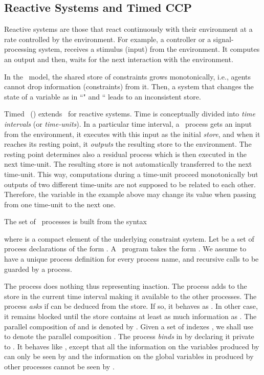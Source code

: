\documentclass{tlp}
\begin{document}
\subsection{Reactive Systems and  Timed CCP}
\label{sec:tcc-definition}
Reactive systems \cite{BeGo92} are those that react continuously with
their environment at a  rate controlled by the environment. 
For example, a controller or a  signal-processing system, receives a
stimulus (input) from the environment. It computes an output  and
then, waits for the next interaction with the environment. 

In the \ccp\ model,  the shared store of constraints grows
monotonically, i.e., agents cannot drop information (constraints)
from it. Then, a system that changes the state of a  variable as in  ``" and `` leads to an inconsistent store. 

Timed \ccp\   (\tccp) \cite{tcc-lics94} extends \ccp\  for
reactive  systems. Time is conceptually divided into \emph{time
intervals }(or \emph{time-units}). In a particular time
interval, a \ccp\ process   gets an input  
from the environment, it executes with this input as the initial
\emph{store}, and when it reaches
its resting point, it \emph{outputs} the resulting store  to the
environment. The resting point determines also a residual process 
which is then executed in the next time-unit. The resulting store 
is not automatically transferred to the next time-unit.
This way, computations during a time-unit proceed monotonically but
outputs of two different time-units are not supposed to be related to
each other. Therefore, the variable  in the example
above may change its value when passing from one 
time-unit to the next one.  
\begin{definition}\label{tcc:syntax} The set
 of \tccp\ processes is built from the syntax

where  is a compact element of the underlying constraint system.
Let  be a set of process declarations of the form
. A \tccp\ program takes the form .  We assume  to have a unique process definition for every process name, and recursive calls to be guarded by a  process. 
\end{definition}

The process  does nothing thus representing inaction. The
process   adds  to the store in the current time
interval making it available to the other processes. 
The process  \emph{asks} if  can be deduced from the
store. If so, it behaves as . In other case, it remains blocked
until the store contains at least as much information as .
 The parallel composition of  and   is denoted by
. Given a  set of indexes , we shall use
 to denote the parallel composition . 
The process    \emph{binds}   in
 by declaring it private to .  It behaves like , except that
all the information on  the variables 
produced by  can only be seen by   and the information on the
global variables in   produced by other processes cannot be
seen by . 
\end{document}
